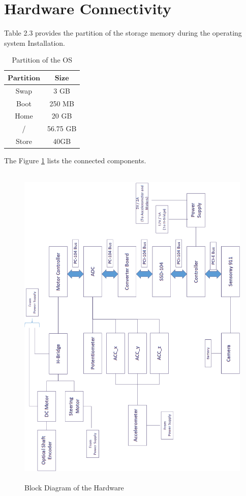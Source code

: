 \section{Hardware Connectivity}

Table 2.3 provides the partition of the storage memory during the operating system Installation. 
\begin {table}[t]
 \centering
   \caption{Partition of the OS }
 \begin{tabular}{||c|c||}
 \hline \hline
  $\textbf{Partition}$  &   $\textbf{Size}$\\
 \hline \hline
  Swap  & 3 GB \\
 \hline
 Boot  & 250 MB \\
 \hline
 Home    & 20 GB\\
\hline
/    & 56.75 GB\\ 
\hline
Store   & 40GB \\
\hline\hline
 \end{tabular}

\label{table:OSsize}
\end{table}
The Figure \ref{fig:HW} lists the connected components.
\begin{figure}[h]
\centering
    \includegraphics[width=17cm,height=16cm,keepaspectratio]{Pictures/HW_block.png}
    \caption{Block Diagram of the Hardware \label{fig:HW}} 
\end{figure}



